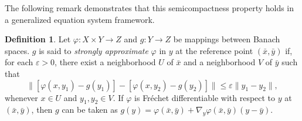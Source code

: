 \documentclass[12pt,twoside,reqno]{amsart}
\theoremstyle{definition}
\newtheorem{definition}[theorem]{Definition}
\numberwithin{equation}{section}
\begin{document}
The following remark demonstrates that this semicompactness property holds in a generalized equation system framework.

\begin{definition}\label{defn: strong approximation_in_y}\cite[Definition 2.3]{dontchev1995implicit}
    Let $\varphi: X \times Y \to Z$ and $g: Y \to Z$ be mappings between Banach spaces. $g$ is said to \emph{strongly approximate} $\varphi$ in $y$ at the reference point $(\bar{x}, \bar{y})$ if, for each $\varepsilon > 0$, there exist a neighborhood $U$ of $\bar{x}$ and a neighborhood $V$ of $\bar{y}$ such that 
    \begin{equation*}
        \big\| [\varphi(x, y_1) - g(y_1)] - [\varphi(x, y_2) - g(y_2)] \big\| \le \varepsilon \|y_1 - y_2\|,
    \end{equation*}
    whenever $x \in U$ and $y_1, y_2 \in V$. If $\varphi$ is Fr\'echet differentiable with respect to $y$ at $(\bar x,\bar y)$, then $g$ can be taken as $g(y)=\varphi(\bar x,\bar y)+\nabla_y \varphi(\bar x,\bar y)(y-\bar y)$.   
\end{definition} 
\end{document}
